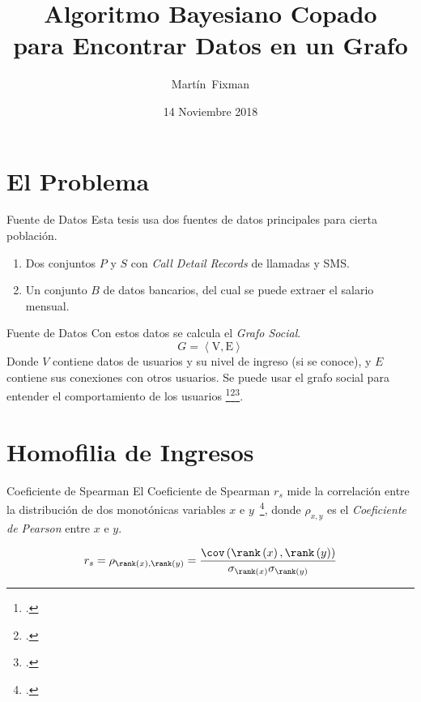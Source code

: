\documentclass[usenames,dvipsnames,table]{beamer}
\title[Algoritmo Copado]{Algoritmo Bayesiano Copado \\ para Encontrar Datos en un Grafo}
\author{Martín~Fixman}
\date{14 Noviembre 2018}
\institute[FCEN UBA]{Facultad de Ciencias Exactas y Naturales \\ Universidad de Buenos Aires}
\begin{document}
\begin{frame}
	\titlepage{}
\end{frame}

\section{El Problema}

\begin{frame}{Fuente de Datos}
	Esta tesis usa dos fuentes de datos principales para cierta población.
	\begin{enumerate}
		\item Dos conjuntos $P$ y $S$ con \emph{Call Detail Records} de llamadas y SMS\@.
		\item Un conjunto $B$ de datos bancarios, del cual se puede extraer el salario mensual.
	\end{enumerate}
\end{frame}

\begin{frame}{Fuente de Datos}
	Con estos datos se calcula el \emph{Grafo Social}.
	\begin{equation*}
		G = \left< \text{V}, \text{E} \right>
	\end{equation*}
	Donde $V$ contiene datos de usuarios y su nivel de ingreso (si se conoce), y $E$ contiene sus conexiones con otros usuarios. Se puede usar el grafo social para entender el comportamiento de los usuarios \footcite{gonzalez2008understanding}\footcite{ponieman2013human}\footcite{sarraute2015city}.

	\begin{center}
		
	\end{center}
\end{frame}

\section{Homofilia de Ingresos}

\begin{frame}{Coeficiente de Spearman}
	El Coeficiente de Spearman $r_s$ mide la correlación entre la distribución de dos monotónicas variables $x$ e $y$~\footcite{statistical_analysis}, donde $\rho_{x, y}$ es el \emph{Coeficiente de Pearson} entre $x$ e $y$.


	\begin{equation*}
		r_s = \rho_{\rank\left(x\right), \rank\left(y\right)} = \frac{\cov\left(\rank\left(x\right), \rank\left(y\right)\right)}{\sigma_{\rank(x)} \sigma_{\rank(y)}}
	\end{equation*}

\end{frame}
\end{document}
